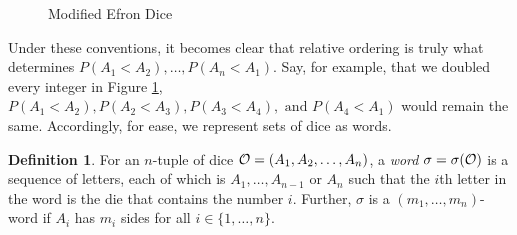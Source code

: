 \documentclass[11pt]{article}
\theoremstyle{definition}
\newtheorem{defn}[theorem]{Definition}
\begin{document}
\begin{figure}[ht]
\centering
{}

\caption{Modified Efron Dice}\label{ModEfronDice}
\end{figure}

Under these conventions, it becomes clear that relative ordering is truly what determines $P(A_1<A_2),\dots,P(A_n<A_1)$. Say, for example, that we doubled every integer in Figure \ref{ModEfronDice}, $P(A_1<A_2),P(A_2<A_3), P(A_3<A_4), \text{ and } P(A_4<A_1)$ would remain the same. Accordingly, for ease, we represent sets of dice as words.

\begin{defn}
    For an $n$-tuple of dice ${\cal O} = (A_1,A_2, \dots, A_n)$, a \emph{word} $\sigma = \sigma(\cal O)$ is a sequence of letters, each of which is $A_1,\dots, A_{n-1}$ or $A_n$ such that the $i$th letter in the word is the die that contains the number $i$. Further, $\sigma$ is a $(m_1,\dots,m_n)$-word if $A_i$ has $m_i$ sides for all $i \in \{1,\dots,n \}$.
\end{defn}
\end{document}
